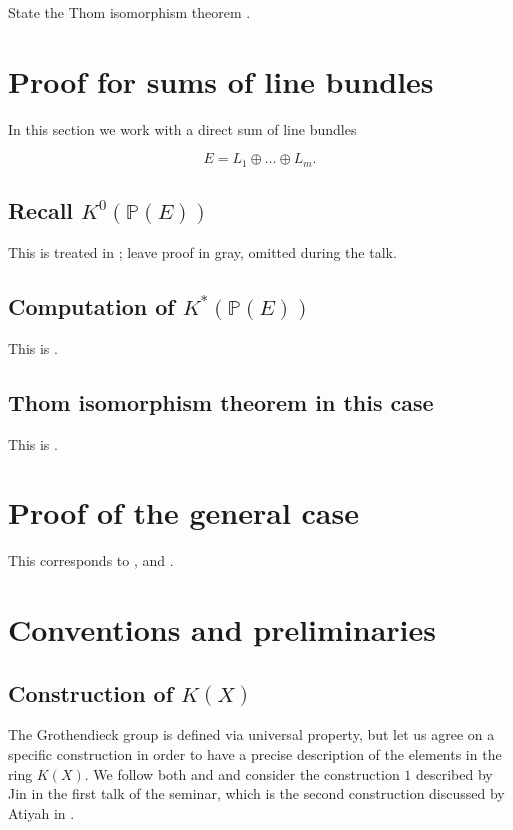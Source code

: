 \documentclass[12pt,a4paper]{amsart}
\theoremstyle{plain}
\theoremstyle{definition}
\theoremstyle{remark}
\begin{document}
State the Thom isomorphism theorem \cite[Corollary 2.7.12]{ati67}.

\section{Proof for sums of line bundles}

In this section we work with a direct sum of line bundles

\[ E = L_{1} \oplus \ldots \oplus L_{m}. \]

\subsection{Recall $K^{0}(\mathbb{P}(E))$}

This is treated in \cite[Proposition 2.5.3]{ati67}; leave proof in gray, omitted during the talk.

\subsection{Computation of $K^{*}(\mathbb{P}(E))$}

This is \cite[Proposition 2.7.1]{ati67}.

\subsection{Thom isomorphism theorem in this case}

This is \cite[Proposition 2.7.2]{ati67}.

\section{Proof of the general case}

This corresponds to \cite[Proposition 2.7.8]{ati67}, \cite[Proposition 2.7.9]{ati67} and \cite[Proposition 2.7.12]{ati67}.

\appendix

\section{Conventions and preliminaries}

\subsection{Construction of $K(X)$}

The Grothendieck group is defined via universal property, but let us agree on a specific construction in order to have a precise description of the elements in the ring $K(X)$.
We follow both \cite{ati67} and \cite{hat03} and consider the construction $1$ described by Jin in the first talk of the seminar, which is the second construction discussed by Atiyah in \cite[p.~42]{ati67}.
\end{document}
